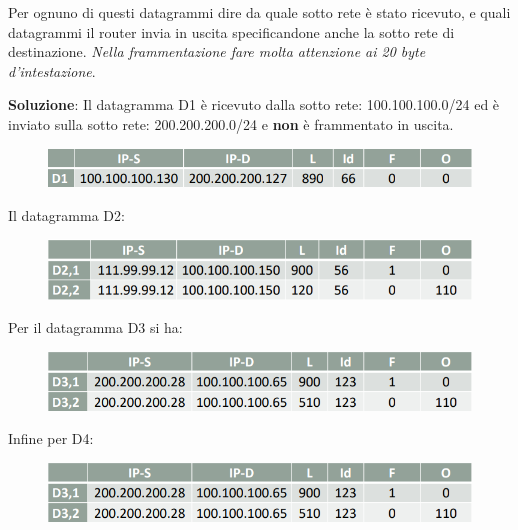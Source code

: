 \documentclass[11pt,a4paper,oneside]{book}
\theoremstyle{definition}
\begin{document}
\begin{enumerate}
	      Per ognuno di questi datagrammi dire da quale sotto rete è stato ricevuto, e
	      quali datagrammi il router invia in uscita specificandone anche la sotto rete di
	      destinazione. \textit{Nella frammentazione fare molta attenzione ai 20 byte d'intestazione}.


	      \textbf{Soluzione}:
	      Il datagramma D1 è ricevuto dalla sotto rete: 100.100.100.0/24 ed è inviato sulla sotto rete: 200.200.200.0/24 e \textbf{non} è frammentato in uscita.

	      \begin{figure}[!h]
		      \includegraphics[scale=0.4]{Immagini/Ip_es2_1.png}
		      \centering
	      \end{figure}

	      Il datagramma D2:

	      \begin{figure}[!h]
		      \includegraphics[scale=0.4]{Immagini/Ip_es2_2.png}
		      \centering
	      \end{figure}

	      Per il datagramma D3 si ha:

	      \begin{figure}[!h]
		      \includegraphics[scale=0.4]{Immagini/Ip_es2_3.png}
		      \centering
	      \end{figure}

	      Infine per D4:

	      \begin{figure}[!h]
		      \includegraphics[scale=0.4]{Immagini/Ip_es2_3.png}
		      \centering
	      \end{figure}
\end{enumerate}
\end{document}
